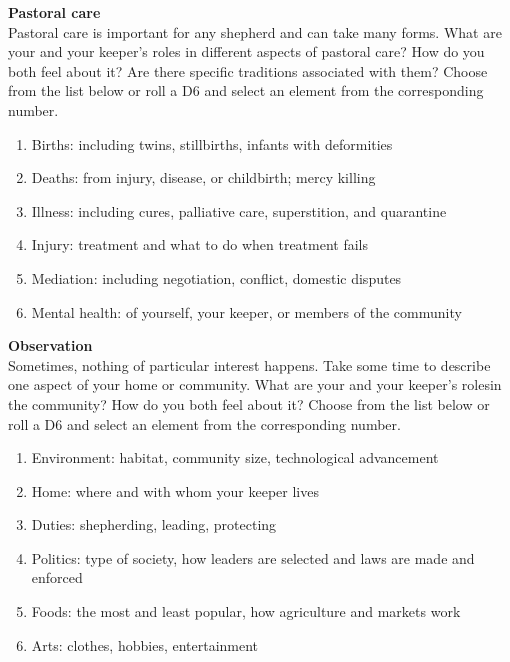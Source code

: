 \documentclass[
  a5paper,
]{article}
\providecommand{\tightlist}{%
  \setlength{\itemsep}{0pt}\setlength{\parskip}{0pt}}
\begin{document}
\textbf{Pastoral care}\\
Pastoral care is important for any shepherd and can take many forms. What are your and your keeper's roles in different aspects of pastoral care? How do you both feel about it? Are there specific traditions associated with them? Choose from the list below or roll a D6 and select an element from the corresponding number.

\begin{enumerate}
\def\labelenumi{\arabic{enumi}.}
\tightlist
\item
  Births: including twins, stillbirths, infants with deformities
\item
  Deaths: from injury, disease, or childbirth; mercy killing
\item
  Illness: including cures, palliative care, superstition, and quarantine
\item
  Injury: treatment and what to do when treatment fails
\item
  Mediation: including negotiation, conflict, domestic disputes
\item
  Mental health: of yourself, your keeper, or members of the community
\end{enumerate}

\textbf{Observation}\\
Sometimes, nothing of particular interest happens. Take some time to describe one aspect of your home or community. What are your and your keeper's rolesin the community? How do you both feel about it? Choose from the list below or roll a D6 and select an element from the corresponding number.

\begin{enumerate}
\def\labelenumi{\arabic{enumi}.}
\tightlist
\item
  Environment: habitat, community size, technological advancement
\item
  Home: where and with whom your keeper lives
\item
  Duties: shepherding, leading, protecting
\item
  Politics: type of society, how leaders are selected and laws are made and enforced
\item
  Foods: the most and least popular, how agriculture and markets work
\item
  Arts: clothes, hobbies, entertainment
\end{enumerate}

\pagebreak

\(~\)
\end{document}
